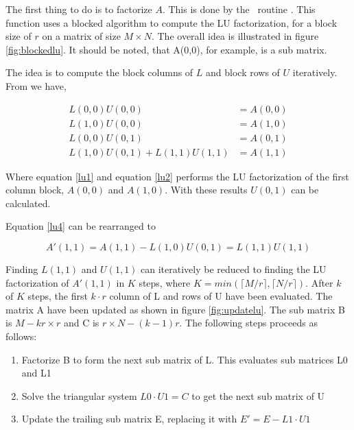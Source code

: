 The first thing to do is to factorize $A$. This is done by the
\LAPACK\ routine . This function uses a blocked
algorithm to compute the LU factorization, for a block size of $r$ on
a matrix of size $M \times N$. The overall idea is illustrated in
figure \ref{fig:blockedlu}. It should be noted, that A(0,0), for
example, is a sub matrix.


The idea is to compute the block columns of $L$ and block rows of $U$
iteratively. From \cite{LU_blocked_algorithm} we have,

\begin{align}
L(0,0)U(0,0) &= A(0,0) \label{lu1} \\
L(1,0)U(0,0) &= A(1,0) \label{lu2} \\
L(0,0)U(0,1) &= A(0,1) \label{lu3} \\
L(1,0)U(0,1) + L(1,1)U(1,1) &= A(1,1) \label{lu4}
\end{align}

\noindent Where equation \ref{lu1} and equation \ref{lu2} performs the
LU factorization of the first column block, $A(0,0)$ and
$A(1,0)$. With these results $U(0,1)$ can be calculated.

Equation \ref{lu4} can be rearranged to 

\[
A'(1,1) = A(1,1) - L(1,0)U(0,1) = L(1,1)U(1,1)
\]

Finding $L(1,1)$ and $U(1,1)$ can iteratively be reduced to finding
the LU factorization of $A'(1,1)$ in $K$ steps, where $K = min(\lceil
M / r \rceil, \lceil N / r \rceil)$. After $k$ of $K$ steps, the first
$k \cdot r$ column of L and rows of U have been evaluated. The matrix
A have been updated as shown in figure \ref{fig:updatelu}. The sub
matrix B is $M - kr \times r$ and C is $r \times N - (k-1)r$. The
following steps proceeds as follows:

\begin{enumerate}
\item{Factorize B to form the next sub matrix of L. This evaluates sub matrices L0 and L1}
\item{Solve the triangular system $L0 \cdot U1 = C$ to get the next sub matrix of U}
\item{Update the trailing sub matrix E, replacing it with $E' = E - L1 \cdot U1$ }
\end{enumerate}

